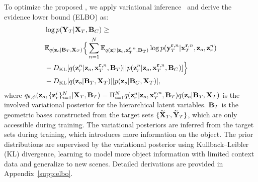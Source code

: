 To optimize the proposed \method{},
we apply variational inference~\citep{garnelo2018neural} and derive the evidence lower bound (ELBO) as:
\begin{equation}
\begin{aligned}
& \log   p({\bf{Y}}_{T}| {\bf{X}}_{T}, {\bf{B}}_{C})
\geq \\
&\mathbb{E}_{q({\bf{z}}_o | {\bf{B}}_T,  {\bf{X}}_T)}  \Big\{  \sum_{n=1}^{N}  \mathbb{E}_{q({\bf{z}}_r^n| {\bf{z}}_o,  {\bf{x}}_{T}^{\mathbf{r}, n}, {\bf{B}_T})} \log p({\bf{y}}_{T}^{{\mathbf{r}}, n}| {\bf{x}}_{T}^{{\mathbf{r}}, n}, {\bf{z}}_o, {\bf{z}}_r^n) \\
&- D_{\text{KL}}[q({\bf{z}}_r^n| {\bf{z}}_o,  {\bf{x}}_{T}^{{\mathbf{r}}, n}, {{\bf{B}}_T}) || p({\bf{z}}_r^n| {\bf{z}}_o,  {\bf{x}}_{T}^{{\mathbf{r}}, n}, {{\bf{B}}_C}) ] \Big\} \\
& - D_{\text{KL}}[q({\bf{z}}_o | {\bf{B}}_T,  {\bf{X}}_T) || p({\bf{z}}_o | {\bf{B}}_C,  {\bf{X}}_T)], \\
\end{aligned}
\end{equation}
where $q_{\theta, \phi}({\bf{z}}_o,  \{{\bf{z}}_r^i\}_{i=1}^{N} | {\bf{X}}_T, {\bf{B}}_T) = \Pi_{i=1}^{N}q({\bf{z}}_r^n| {\bf{z}}_o,  {\bf{x}}_{T}^{{\mathbf{r}}, n}, {{\bf{B}}_T}) q({\bf{z}}_o | {\bf{B}}_T,  {\bf{X}}_T)$ is the involved variational posterior for the hierarchical latent variables.  ${\bf{B}}_T$ is the geometric bases constructed from the target sets $\{{\bf{\widetilde{X}}}_{T}, {\bf{\widetilde{Y}}}_{T}\}$, which are only accessible during training. 
The variational posteriors are inferred from the target sets during training, which introduces more information on the object. 
The prior distributions are supervised by the variational posterior using Kullback–Leibler (KL) divergence, learning to model more object information with limited context data and generalize to new scenes. Detailed derivations are provided in Appendix~\ref{supp:elbo}.

